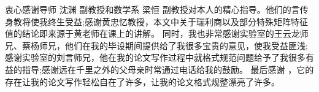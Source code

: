 \begin{acknowledgement}
  衷心感谢导师 沈渊 副教授和数学系 梁恒 副教授对本人的精心指导。他们的言传身教将使我终生受益;感谢黄忠忆教授，本文中关于瑞利商以及部分特殊矩阵特征值的结论即来源于黄老师在课上的讲解。
  同时，我也非常感谢实验室的王云龙师兄、蔡杨师兄，他们在我的毕设期间提供给了我很多宝贵的意见，使我受益匪浅;感谢实验室的刘言师兄，他在我的论文写作过程中就格式规范问题给予了我很多有益的指导;感谢远在千里之外的父母亲时常通过电话给我的鼓励。
  最后感谢 \thuthesis，它的存在让我的论文写作轻松自在了许多，让我的论文格式规整漂亮了许多。
\end{acknowledgement}
